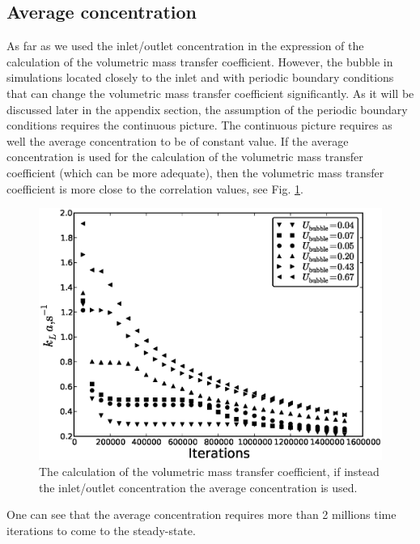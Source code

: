 \documentclass{article}
\begin{document}
\subsection{Average concentration}
As far as we used the inlet/outlet concentration in the expression of the calculation of the
volumetric mass transfer coefficient. However, the bubble in simulations located closely to the
inlet and with periodic boundary conditions that can change the volumetric mass transfer
coefficient significantly. As it will be discussed later in the appendix section, the assumption of
the periodic boundary conditions requires the continuous picture. The continuous picture requires as
well the average concentration to be of constant value. If the average concentration is used for
the calculation of the volumetric mass transfer coefficient {\color{red} (which can be more
adequate)}, then the volumetric mass transfer coefficient is more close to the correlation values,
see Fig. \ref{fig:average:concentration}. 
\begin{figure}[htb!]
\includegraphics[width=\textwidth]{Figures/steady_state_average.eps}
\caption{The calculation of the volumetric mass transfer coefficient, if instead the inlet/outlet
concentration the average concentration is used.\label{fig:average:concentration}}
\end{figure}
One can see that the average concentration requires more than 2 millions time iterations to come to
the steady-state.
\end{document}
